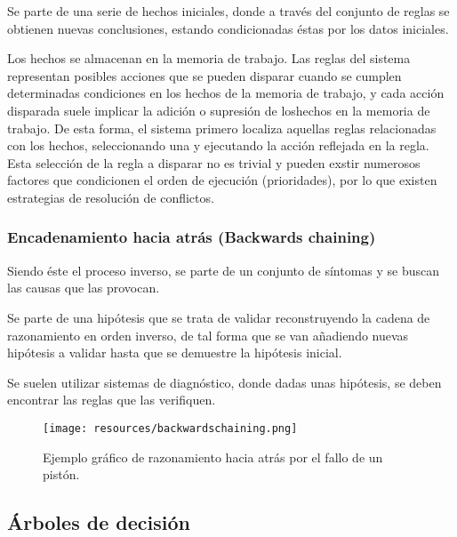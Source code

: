 \documentclass[a4paper, 11pt, titlepage]{article}
\begin{document}
            Se parte de una serie de hechos iniciales, donde a través del conjunto de reglas se 
            obtienen nuevas conclusiones, estando condicionadas éstas por los datos iniciales.

            Los hechos se almacenan en la memoria de trabajo. Las reglas del sistema representan 
            posibles acciones que se pueden disparar cuando se cumplen determinadas condiciones
            en los hechos de la memoria de trabajo, y cada acción disparada suele implicar la adición 
            o supresión de loshechos en la memoria de trabajo. De esta forma, el sistema primero 
            localiza aquellas reglas relacionadas con los hechos, seleccionando una y ejecutando la 
            acción reflejada en la regla. Esta selección de la regla a disparar no es trivial y 
            pueden exstir numerosos factores que condicionen el orden de ejecución (prioridades), 
            por lo que existen estrategias de resolución de conflictos.

        \subsubsection{Encadenamiento hacia atrás (Backwards chaining)}

            Siendo éste el proceso inverso, se parte de un conjunto de síntomas y se buscan 
            las causas que las provocan.

            Se parte de una hipótesis que se trata de validar reconstruyendo la cadena de 
            razonamiento en orden inverso, de tal forma que se van añadiendo nuevas hipótesis 
            a validar hasta que se demuestre la hipótesis inicial.

            Se suelen utilizar sistemas de diagnóstico, donde dadas unas hipótesis, se deben 
            encontrar las reglas que las verifiquen.

            \begin{figure}[htp]
                \centering
                \texttt{[image: resources/backwardschaining.png]}
                \caption{Ejemplo gráfico de razonamiento hacia atrás por el fallo de un pistón.}
                \label{backwardschaining}
            \end{figure}    

    \subsection{Árboles de decisión}
\end{document}
